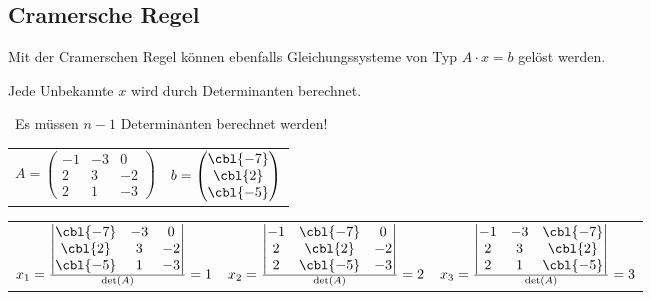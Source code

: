 \subsection{Cramersche Regel}

Mit der Cramerschen Regel können ebenfalls Gleichungssysteme von Typ $A \cdot x = b$ gelöst werden. 

Jede Unbekannte $x$ wird durch Determinanten berechnet.

\textrightarrow\ Es müssen $n-1$ Determinanten berechnet werden!	
		
		

\begin{tabular}{ll}
	$A = 
	\begin{pmatrix}
		-1 & -3 & 0  \\
		2  & 3  & -2 \\
		2  & 1  & -3
	\end{pmatrix}$ &
	$b = 
	\begin{pmatrix}	
		\cbl{-7} 	\\ 
		\cbl{2}		\\ 
		\cbl{-5}	
	\end{pmatrix}$
\end{tabular}

\vspace{0.2cm}

\begin{tabular}{lll}
	$x_1 = \frac{
	\begin{vmatrix}
		\cbl{-7} 	& -3 	& 0  \\
		\cbl{2}		& 3 	& -2 \\
		\cbl{-5} 	& 1 	& -3 \\
	\end{vmatrix}}
	{\det(A)} = 1$ &
	$x_2 = \frac{
		\begin{vmatrix}
			-1 	& \cbl{-7} & 0  \\
			2 	& \cbl{2}  & -2 \\
			2 	& \cbl{-5}  & -3 \\
		\end{vmatrix}}
		{\det(A)} = 2$ &
	$x_3 = \frac{
		\begin{vmatrix}
			-1 & -3 & \cbl{-7}	\\
			2  & 3  & \cbl{2} 	\\
			2  & 1  & \cbl{-5} 	\\
		\end{vmatrix}}
		{\det(A)} = 3$ 	
\end{tabular}

